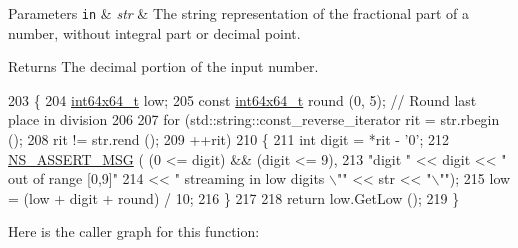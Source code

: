 \begin{DoxyParams}[1]{Parameters}
\mbox{\tt in}  & {\em str} & The string representation of the fractional part of a number, without integral part or decimal point. \\
\hline
\end{DoxyParams}
\begin{DoxyReturn}{Returns}
The decimal portion of the input number. 
\end{DoxyReturn}

\begin{DoxyCode}
203 \{
204   \hyperlink{classint64x64__t}{int64x64\_t} low;
205   \textcolor{keyword}{const} \hyperlink{classint64x64__t}{int64x64\_t} round (0, 5);  \textcolor{comment}{// Round last place in division}
206 
207   \textcolor{keywordflow}{for} (std::string::const\_reverse\_iterator rit = str.rbegin ();
208        rit != str.rend ();
209        ++rit)
210     \{
211       \textcolor{keywordtype}{int} digit = *rit - \textcolor{charliteral}{'0'};
212       \hyperlink{assert_8h_aff5ece9066c74e681e74999856f08539}{NS\_ASSERT\_MSG} ( (0 <= digit) && (digit <= 9),
213                       \textcolor{stringliteral}{"digit "} << digit << \textcolor{stringliteral}{" out of range [0,9]"}
214                       << \textcolor{stringliteral}{" streaming in low digits \(\backslash\)""} << str << \textcolor{stringliteral}{"\(\backslash\)""});
215       low = (low + digit + round) / 10;
216     \}
217 
218   \textcolor{keywordflow}{return} low.GetLow ();
219 \}
\end{DoxyCode}


Here is the caller graph for this function\+:


